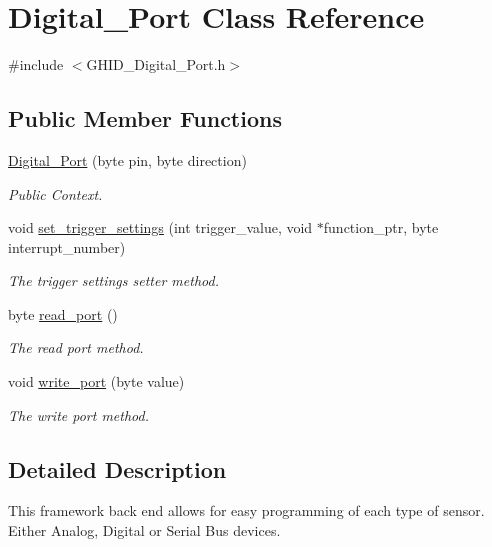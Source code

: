 \hypertarget{class_digital___port}{\section{\-Digital\-\_\-\-Port \-Class \-Reference}
\label{class_digital___port}
}


{\ttfamily \#include $<$\-G\-H\-I\-D\-\_\-\-Digital\-\_\-\-Port.\-h$>$}

\subsection*{\-Public \-Member \-Functions}
\begin{DoxyCompactItemize}
\item 
\hyperlink{class_digital___port_a115ae6c0689177ae6fe9e4d70a6358dd}{\-Digital\-\_\-\-Port} (byte pin, byte direction)
\begin{DoxyCompactList}\small\item\em \-Public \-Context. \end{DoxyCompactList}\item 
void \hyperlink{class_digital___port_a8507662ad2a3a43482cbfe18e9fad029}{set\-\_\-trigger\-\_\-settings} (int trigger\-\_\-value, void $\ast$function\-\_\-ptr, byte interrupt\-\_\-number)
\begin{DoxyCompactList}\small\item\em \-The trigger settings setter method. \end{DoxyCompactList}\item 
byte \hyperlink{class_digital___port_ae71e1909b3f013d44d1f58c57fbb8b15}{read\-\_\-port} ()
\begin{DoxyCompactList}\small\item\em \-The read port method. \end{DoxyCompactList}\item 
void \hyperlink{class_digital___port_a6a0a750796ea9593a69725496132a9af}{write\-\_\-port} (byte value)
\begin{DoxyCompactList}\small\item\em \-The write port method. \end{DoxyCompactList}\end{DoxyCompactItemize}


\subsection{\-Detailed \-Description}
\-This framework back end allows for easy programming of each type of sensor. \-Either \-Analog, \-Digital or \-Serial \-Bus devices. 

